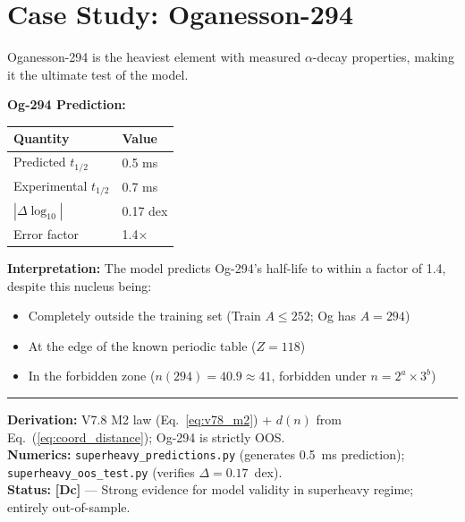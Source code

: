 \documentclass[11pt,a4paper]{article}
\newcommand{\tagDc}{\textcolor{blue!70!black}{\textbf{[Dc]}}}
\begin{document}
\section{Case Study: Oganesson-294}
\label{sec:og294}

Oganesson-294 is the heaviest element with measured $\alpha$-decay properties, making it the ultimate test of the model.

\begin{resultbox}
\textbf{Og-294 Prediction:}

\begin{center}
\begin{tabular}{ll}
\toprule
\textbf{Quantity} & \textbf{Value} \\
\midrule
Predicted $t_{1/2}$ & 0.5 ms \\
Experimental $t_{1/2}$ & 0.7 ms \\
$|\Delta \log_{10}|$ & 0.17 dex \\
Error factor & 1.4$\times$ \\
\bottomrule
\end{tabular}
\end{center}

\textbf{Interpretation:} The model predicts Og-294's half-life to within a factor of 1.4, despite this nucleus being:
\begin{itemize}[nosep]
    \item Completely outside the training set (Train $A \leq 252$; Og has $A = 294$)
    \item At the edge of the known periodic table ($Z = 118$)
    \item In the forbidden zone ($n(294) = 40.9 \approx 41$, forbidden under $n = 2^a \times 3^b$)
\end{itemize}

\vspace{0.3em}\hrule\vspace{0.3em}
\textbf{Derivation:} V7.8 M2 law (Eq.~\ref{eq:v78_m2}) + $d(n)$ from Eq.~(\ref{eq:coord_distance}); Og-294 is strictly OOS.\\
\textbf{Numerics:} \texttt{superheavy\_predictions.py} (generates 0.5~ms prediction); \texttt{superheavy\_oos\_test.py} (verifies $\Delta = 0.17$~dex).\\
\textbf{Status:} \tagDc{} --- Strong evidence for model validity in superheavy regime; entirely out-of-sample.
\end{resultbox}
\end{document}
